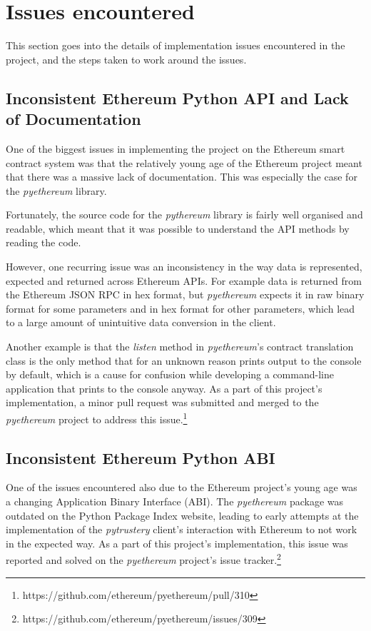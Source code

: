 \documentclass[12pt]{report}
\begin{document}
	\section{Issues encountered}
	This section goes into the details of implementation issues encountered in the project, and the steps taken to work around the issues.
	
	\subsection{Inconsistent Ethereum Python API and Lack of Documentation}
	One of the biggest issues in implementing the project on the Ethereum smart contract system was that the relatively young age of the Ethereum project meant that there was a massive lack of documentation. This was especially the case for the \textit{pyethereum} library.
	
	Fortunately, the source code for the \textit{pythereum} library is fairly well organised and readable, which meant that it was possible to understand the API methods by reading the code.
	
	However, one recurring issue was an inconsistency in the way data is represented, expected and returned across Ethereum APIs. For example data is returned from the Ethereum JSON RPC in hex format, but \textit{pyethereum} expects it in raw binary format for some parameters and in hex format for other parameters, which lead to a large amount of unintuitive data conversion in the client.
	
	Another example is that the \textit{listen} method in \textit{pyethereum}'s contract translation class is the only method that for an unknown reason prints output to the console by default, which is a cause for confusion while developing a command-line application that prints to the console anyway. As a part of this project's implementation, a minor pull request was submitted and merged to the \textit{pyethereum} project to address this issue.\footnote{https://github.com/ethereum/pyethereum/pull/310}
	
	\subsection{Inconsistent Ethereum Python ABI}
	One of the issues encountered also due to the Ethereum project's young age was a changing Application Binary Interface (ABI). The \textit{pyethereum} package was outdated on the Python Package Index website, leading to early attempts at the implementation of the \textit{pytrustery} client's interaction with Ethereum to not work in the expected way. As a part of this project's implementation, this issue was reported and solved on the \textit{pyethereum} project's issue tracker.\footnote{https://github.com/ethereum/pyethereum/issues/309}
	
\end{document}

